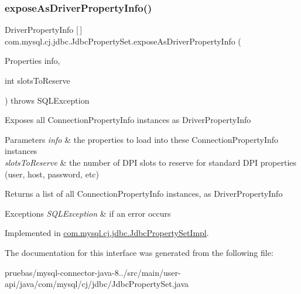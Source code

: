 \subsubsection{\texorpdfstring{expose\+As\+Driver\+Property\+Info()}{exposeAsDriverPropertyInfo()}}
{\footnotesize\ttfamily Driver\+Property\+Info \mbox{[}$\,$\mbox{]} com.\+mysql.\+cj.\+jdbc.\+Jdbc\+Property\+Set.\+expose\+As\+Driver\+Property\+Info (\begin{DoxyParamCaption}\item[{Properties}]{info,  }\item[{int}]{slots\+To\+Reserve }\end{DoxyParamCaption}) throws S\+Q\+L\+Exception}

Exposes all Connection\+Property\+Info instances as Driver\+Property\+Info


\begin{DoxyParams}{Parameters}
{\em info} & the properties to load into these Connection\+Property\+Info instances \\
\hline
{\em slots\+To\+Reserve} & the number of D\+PI slots to reserve for \textquotesingle{}standard\textquotesingle{} D\+PI properties (user, host, password, etc)\\
\hline
\end{DoxyParams}
\begin{DoxyReturn}{Returns}
a list of all Connection\+Property\+Info instances, as Driver\+Property\+Info
\end{DoxyReturn}

\begin{DoxyExceptions}{Exceptions}
{\em S\+Q\+L\+Exception} & if an error occurs \\
\hline
\end{DoxyExceptions}


Implemented in \mbox{\hyperlink{classcom_1_1mysql_1_1cj_1_1jdbc_1_1_jdbc_property_set_impl_a0bcb782acac24d633f1c6b5108102dcd}{com.\+mysql.\+cj.\+jdbc.\+Jdbc\+Property\+Set\+Impl}}.



The documentation for this interface was generated from the following file\+:\begin{DoxyCompactItemize}
\item 
pruebas/mysql-\/connector-\/java-\/8../src/main/user-\/api/java/com/mysql/cj/jdbc/Jdbc\+Property\+Set.\+java\end{DoxyCompactItemize}
